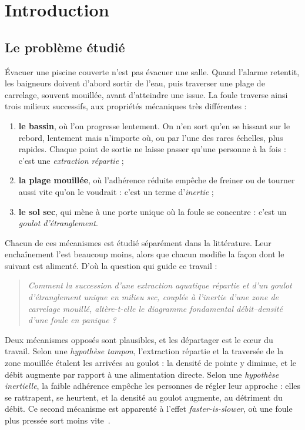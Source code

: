 \section{Introduction}
\label{sec:introduction}

\subsection{Le problème étudié}

Évacuer une piscine couverte n'est pas évacuer une salle. Quand l'alarme
retentit, les baigneurs doivent d'abord sortir de l'eau, puis traverser une
plage de carrelage, souvent mouillée, avant d'atteindre une issue. La foule
traverse ainsi trois milieux successifs, aux propriétés mécaniques très
différentes :
\begin{enumerate}
\item \textbf{le bassin}, où l'on progresse lentement. On n'en sort qu'en se
  hissant sur le rebord, lentement mais n'importe où, ou par l'une des rares
  échelles, plus rapides. Chaque point de sortie ne laisse passer qu'une
  personne à la fois : c'est une \emph{extraction répartie} ;
\item \textbf{la plage mouillée}, où l'adhérence réduite empêche de freiner ou
  de tourner aussi vite qu'on le voudrait : c'est un terme d'\emph{inertie} ;
\item \textbf{le sol sec}, qui mène à une porte unique où la foule se
  concentre : c'est un \emph{goulot d'étranglement}.
\end{enumerate}
Chacun de ces mécanismes est étudié séparément dans la littérature. Leur
enchaînement l'est beaucoup moins, alors que chacun modifie la façon dont le
suivant est alimenté. D'où la question qui guide ce travail :
\begin{quote}
\emph{Comment la succession d'une extraction aquatique répartie et d'un goulot
d'étranglement unique en milieu sec, couplée à l'inertie d'une zone de carrelage
mouillé, altère-t-elle le diagramme fondamental débit--densité d'une foule en
panique ?}
\end{quote}

Deux mécanismes opposés sont plausibles, et les départager est le cœur du
travail. Selon une \emph{hypothèse tampon}, l'extraction répartie et la
traversée de la zone mouillée étalent les arrivées au goulot : la densité de
pointe y diminue, et le débit augmente par rapport à une alimentation directe.
Selon une \emph{hypothèse inertielle}, la faible adhérence empêche les personnes
de régler leur approche : elles se rattrapent, se heurtent, et la densité au
goulot augmente, au détriment du débit. Ce second mécanisme est apparenté à
l'effet \emph{faster-is-slower}, où une foule plus pressée sort moins
vite~\cite{helbing2000}.

